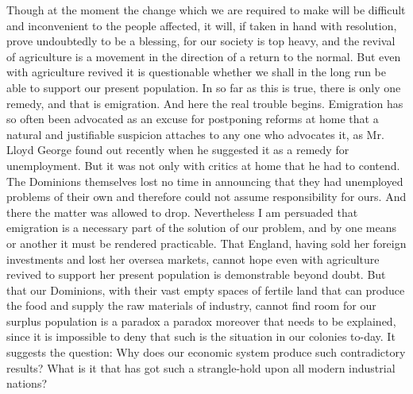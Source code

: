 \documentclass{book}
\begin{document}
Though at the moment the change which we are required to make will be difficult and inconvenient to the people affected, it will, if taken in hand with resolution, prove undoubtedly to be a blessing, for our society is top heavy, and the revival of agriculture is a movement in the direction of a return to the normal. But even with agriculture revived it is questionable whether we shall in the long run be able to support our present population. In so far as this is true, there is only one remedy, and that is emigration. And here the real trouble begins. Emigration has so often been advocated as an excuse for postponing reforms at home that a natural and justifiable suspicion attaches to any one who advocates it, as Mr. Lloyd George found out recently when he suggested it as a remedy for unemployment. But it was not only with critics at home that he had to contend. The Dominions themselves lost no time in announcing that they had unemployed problems of their own and therefore could not assume responsibility for ours. And there the matter was allowed to drop. Nevertheless I am persuaded that emigration is a necessary part of the solution of our problem, and by one means or another it must be rendered practicable. That England, having sold her foreign investments and lost her oversea markets, cannot hope even with agriculture revived to support her present population is demonstrable beyond doubt. But that our Dominions, with their vast empty spaces of fertile land that can produce the food and supply the raw materials of industry, cannot find room for our surplus population is a paradox a paradox moreover that needs to be explained, since it is impossible to deny that such is the situation in our colonies to-day. It suggests the question: Why does our economic system produce such contradictory results? What is it that has got such a strangle-hold upon all modern industrial nations?
\end{document}
